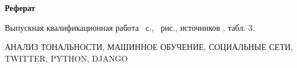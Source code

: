 \begin{center}
	\textbf{Реферат}
\end{center}

Выпускная квалификационная работа ~с., ~рис., источников , табл. 3.

АНАЛИЗ ТОНАЛЬНОСТИ, МАШИННОЕ ОБУЧЕНИЕ, СОЦИАЛЬНЫЕ СЕТИ, TWITTER, PYTHON, DJANGO

